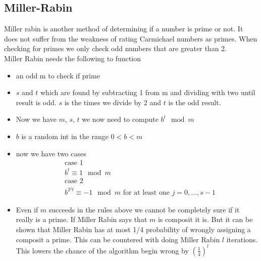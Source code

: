 \subsection{Miller-Rabin}
Miller rabin is another method of determining if a number is prime or not. It does not suffer from the weakness of rating Carmichael numbers as primes. When checking for primes we only check odd numbers that are greater than 2.\\
Miller Rabin needs the following to function
\begin{itemize}
\item an odd m to check if prime
\item $s$ and $t$ which are found by subtracting 1 from m and dividing with two until result is odd. $s$ is the times we divide by 2 and $t$ is the odd result.
\item Now we have $m$, $s$, $t$ we now need to compute $b^t\mod m$
\item $b$ is a random int in the range $0<b<m$
\item now we have two cases
\begin{align*}
&\mbox{case 1}\\
&b^t \equiv 1 \mod m\\
&\mbox{case 2}\\
&b^{2^{j}t} \equiv -1 \mod m \mbox{ for at least one $j=0,...,s-1$}
\end{align*}
\item Even if $m$ succeeds in the rules above we cannot be completely sure if it really is a prime. If Miller Rabin says that $m$ is composit it is. But it can be shown that Miller Rabin has at most 1/4 probability of wrongly assigning a composit a prime. This can be countered with doing Miller Rabin $l$ iterations. This lowers the chance of the algorithm begin wrong by $(\frac{1}{4})^l$

\end{itemize}